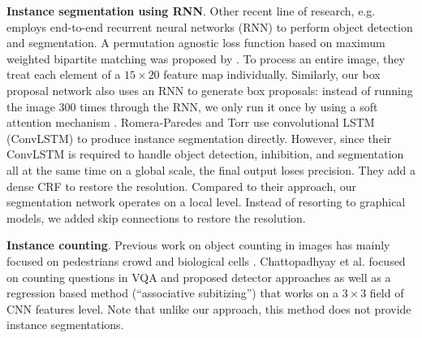 \textbf{Instance segmentation using RNN}. Other recent line of research, e.g.
\cite{stewart15lstmdet, park15ris, romeraparedes15ris} employs end-to-end
recurrent neural networks (RNN) to perform object detection and segmentation. A
permutation agnostic loss function based on maximum weighted bipartite matching
was proposed by \cite{stewart15lstmdet}. To process an entire image, they treat
each element of a $15\times20$ feature map individually. Similarly, our box
proposal network also uses an RNN to generate box proposals: instead of running
the image 300 times through the RNN, we only run it once by using a soft
attention mechanism \cite{xu15caption}. Romera-Paredes and Torr
\cite{romeraparedes15ris} use convolutional LSTM (ConvLSTM)
\cite{shi2015convlstm} to produce instance segmentation directly. However,
since their ConvLSTM is required to handle object detection, inhibition, and
segmentation all at the same time on a global scale, the final output loses
precision. They add a dense CRF to restore the resolution. Compared to their
approach, our segmentation network operates on a local level. Instead of
resorting to graphical models, we added skip connections to restore the
resolution.

\textbf{Instance counting}. Previous work on object counting in images has
mainly focused on pedestrians crowd and biological cells
\cite{lempitsky10count}. Chattopadhyay et al. \cite{chattopadhyay16count}
focused on counting questions in VQA and proposed detector approaches as well
as a regression based method (``associative subitizing'') that works on a $3
\times 3$ field of CNN features level. Note that unlike our approach, this
method does not provide instance segmentations.
